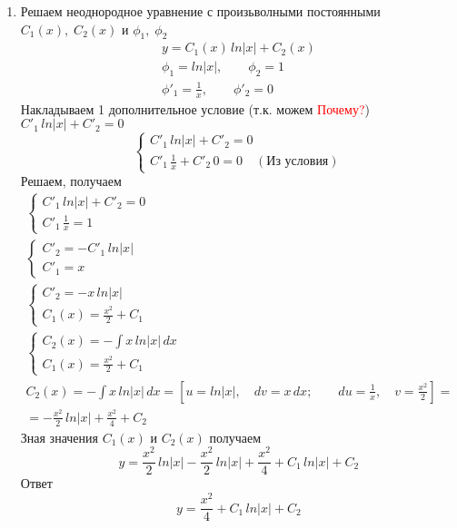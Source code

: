 \begin{Example}
\begin{enumerate}
        \item Решаем неоднородное уравнение с произьволными постоянными $C_1(x),\; C_2(x)$ и $\phi_1,\; \phi_2$
        \begin{gather*}
            y = C_1(x)\,ln|x| + C_2(x)\\
            \phi_1 = ln|x|, \qquad \phi_2 = 1\\
            \phi'_1 = \frac{1}{x}, \qquad \phi'_2 = 0
        \end{gather*} 
        Накладываем 1 дополнительное условие (т.к. можем \textcolor{red}{Почему?}) $C'_1\,ln|x| + C'_2 = 0$\\
        \[
            \begin{cases}
                C'_1\,ln|x| + C'_2 = 0\\
                C'_1\,\frac{1}{x} + C'_2\,0 = 0 \quad (\text{Из условия})
            \end{cases}
        \]
        Решаем, получаем
        \begin{gather*}
            \begin{cases}  
                C'_1\,ln|x| + C'_2 = 0\\
                C'_1\,\frac{1}{x} = 1
            \end{cases}\\
            \begin{cases}  
            C'_2 = - C'_1\,ln|x|\\
            C'_1 = x
            \end{cases}\\
            \begin{cases}  
            C'_2 = - x\,ln|x|\\
            C_1(x) = \frac{x^2}{2} + C_1
            \end{cases}\\
            \begin{cases}  
            C_2(x) = -\int x\,ln|x|\,dx\\
            C_1(x) = \frac{x^2}{2} + C_1
            \end{cases}\\
            C_2(x) = -\int x\,ln|x|\,dx = \left[u = ln|x|, \quad dv = x\,dx; \qquad du = \frac{1}{x}, \quad v = \frac{x^2}{2}\right] = \\
            = - \frac{x^2}{2}\,ln|x| + \frac{x^2}{4} + C_2
        \end{gather*}
        Зная значения $C_1(x)$ и $C_2(x)$ получаем
        \[
            y = \frac{x^2}{2}\,ln|x| - \frac{x^2}{2}\,ln|x| + \frac{x^2}{4} + C_1\,ln|x| + C_2
        \]
        Ответ
        \[
            y = \frac{x^2}{4} + C_1\,ln|x| + C_2
        \]
    \end{enumerate}
\end{Example}